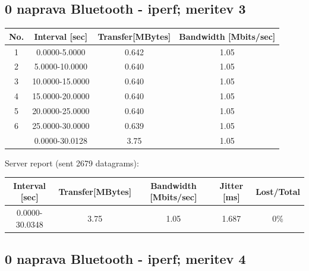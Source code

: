 \documentclass[11pt,a4paper,slovene]{article}
\begin{document}
\subsection{0 naprava Bluetooth - iperf; meritev 3}

\begin{table}[H]
	\begin{adjustwidth}{-3cm}{-3cm}
	\centering
		\begin{tabular}{c|c|c|c}
		\hline
		\textbf{No.} & \textbf{Interval [sec]} & \textbf{Transfer[MBytes]} & \textbf{Bandwidth [Mbits/sec]}\\
     		\hline
     		1 & 0.0000-5.0000 & 0.642 & 1.05\\
  		2 & 5.0000-10.0000 & 0.640 & 1.05\\
  		3 & 10.0000-15.0000 & 0.640 & 1.05\\
  		4 & 15.0000-20.0000 & 0.640 & 1.05\\
  		5 & 20.0000-25.0000 & 0.640 & 1.05\\
  		6 & 25.0000-30.0000 & 0.639 & 1.05\\
  		\hline
  		& 0.0000-30.0128 & 3.75 & 1.05\\
  		\hline
    		\end{tabular}
    	\end{adjustwidth}
\end{table}

Server report (sent 2679 datagrams):\\

\begin{table}[H]
	\begin{adjustwidth}{-3cm}{-3cm}
	\centering
		\begin{tabular}{c|c|c|c|c}
		\hline
		\textbf{Interval [sec]} & \textbf{Transfer[MBytes]} & \textbf{Bandwidth [Mbits/sec]} & \textbf{Jitter [ms]} & \textbf{Lost/Total}\\
     	\hline
     	0.0000-30.0348 & 3.75 & 1.05 & 1.687 & 0\%\\
  		\hline
    		\end{tabular}
    	\end{adjustwidth}
\end{table}

\subsection{0 naprava Bluetooth - iperf; meritev 4}
\end{document}

